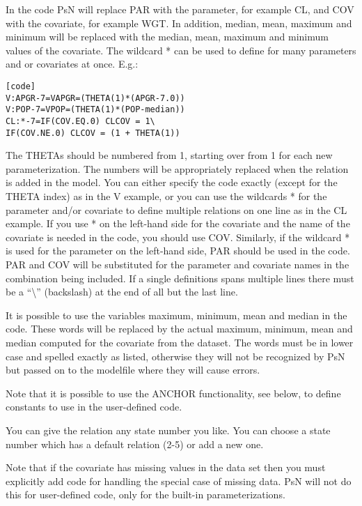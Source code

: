 In the code PsN will replace PAR with the parameter, for example CL, and COV with the covariate, for example WGT. In addition, median, mean, maximum and minimum will be replaced with the median, mean, maximum and minimum values of the covariate. The wildcard * can be used to define for many parameters and or covariates at once. E.g.:

\begin{verbatim}
[code]
V:APGR-7=VAPGR=(THETA(1)*(APGR-7.0))
V:POP-7=VPOP=(THETA(1)*(POP-median))
CL:*-7=IF(COV.EQ.0) CLCOV = 1\ 
IF(COV.NE.0) CLCOV = (1 + THETA(1))
\end{verbatim}

The THETAs should be numbered from 1, starting over from 1 for each new parameterization. The numbers will be appropriately replaced when the relation is added in the model. You can either specify the code exactly (except for the THETA index) as in the V example, or you can use the wildcards * for the parameter and/or covariate to define multiple relations on one line as in the CL example.  If you use * on the left-hand side for the covariate and the name of the covariate is needed in the code, you should use COV. Similarly, if the wildcard * is used for the parameter on the left-hand side, PAR should be used in the code. PAR and COV will be substituted for the parameter and covariate names in the combination being included. If a single definitions spans multiple lines there must be a  “\textbackslash” (backslash) at the end of all but the last line.

It is possible to use the variables maximum, minimum, mean and median in the code. These words will be replaced by the actual maximum, minimum, mean and median computed for the covariate from the dataset. The words must be in lower case and spelled exactly as listed, otherwise they will not be recognized by PsN but passed on to the modelfile where they will cause errors. 

Note that it is possible to use the ANCHOR functionality, see below, to define constants to use in the user-defined code.

You can give the relation any state number you like. You can choose a state number which has a default relation (2-5) or add a new one. 

Note that if the covariate has missing values in the data set then you must explicitly add code for handling the special case of missing data. PsN will not do this for user-defined code, only for the built-in parameterizations.

